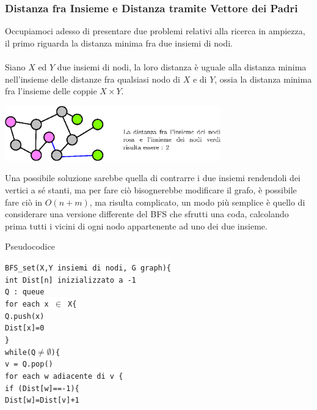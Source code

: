 \documentclass[12pt, letterpaper]{article}
\newcommand{\codee}[1]{\colorbox{white}{\texttt{#1}}}
\newcommand{\acc}{\\\hphantom{}\\}
\begin{document}
\subsubsection{Distanza fra Insieme e Distanza tramite Vettore dei Padri}
Occupiamoci adesso di presentare due problemi relativi alla ricerca in ampiezza, il primo riguarda la distanza minima fra 
due insiemi di nodi.\acc 
Siano $X$ ed $Y$ due insiemi di nodi, la loro distanza è uguale alla distanza minima nell'insieme delle distanze fra qualsiasi 
nodo di $X$ e di $Y$, ossia la distanza minima fra l'insieme delle coppie $X\times Y$. \begin{center}
    \includegraphics[width=0.7\textwidth ]{images/distInsiemi.eps}
    \end{center} 
Una possibile soluzione sarebbe quella di contrarre i due insiemi rendendoli dei vertici a sé stanti, ma per fare ciò 
bisognerebbe modificare il grafo, è possibile fare ciò in $O(n+m)$, ma risulta complicato, un modo più semplice è 
quello di considerare una versione differente del BFS che sfrutti una coda, calcolando prima tutti i vicini 
di ogni nodo appartenente ad uno dei due insieme.\begin{center}
    Pseudocodice
\end{center}
\codee{BFS\_set(X,Y insiemi di nodi, G graph)\{}\\
\hphantom{ident}\codee{int Dist[n] inizializzato a -1}\\
\hphantom{ident}\codee{Q : queue}\\
\hphantom{ident}\codee{for each x $\in$ X\{}\\
\hphantom{ident}\hphantom{ident}\codee{Q.push(x)}\\
\hphantom{ident}\hphantom{ident}\codee{Dist[x]=0}\\
\hphantom{ident}\codee{\}}\\
\hphantom{ident}\codee{while(Q$\ne\emptyset$)\{}\\
\hphantom{ident}\hphantom{ident}\codee{v = Q.pop()}\\
\hphantom{ident}\hphantom{ident}\codee{for each w adiacente di v \{}\\
\hphantom{ident}\hphantom{ident}\hphantom{ident}\codee{if (Dist[w]==-1)\{}\\
\hphantom{ident}\hphantom{ident}\hphantom{ident}\codee{}\hphantom{ident}\codee{Dist[w]=Dist[v]+1}\\
\end{document}
